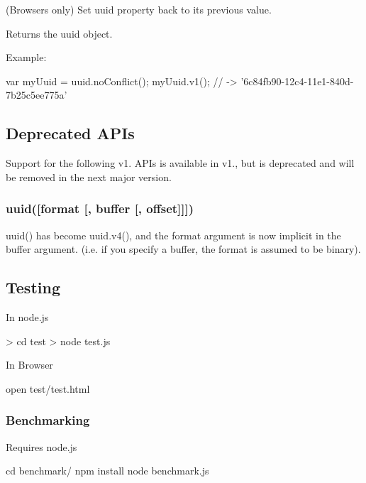 (Browsers only) Set {\ttfamily uuid} property back to it\textquotesingle{}s previous value.

Returns the uuid object.

Example\+:


\begin{DoxyCode}
var myUuid = uuid.noConflict();
myUuid.v1(); // -> '6c84fb90-12c4-11e1-840d-7b25c5ee775a'
\end{DoxyCode}


\subsection*{Deprecated A\+P\+Is}

Support for the following v1. A\+P\+Is is available in v1., but is deprecated and will be removed in the next major version.

\subsubsection*{uuid(\mbox{[}format \mbox{[}, buffer \mbox{[}, offset\mbox{]}\mbox{]}\mbox{]})}

uuid() has become uuid.\+v4(), and the {\ttfamily format} argument is now implicit in the {\ttfamily buffer} argument. (i.\+e. if you specify a buffer, the format is assumed to be binary).

\subsection*{Testing}

In node.\+js


\begin{DoxyCode}
> cd test
> node test.js
\end{DoxyCode}


In Browser


\begin{DoxyCode}
open test/test.html
\end{DoxyCode}


\subsubsection*{Benchmarking}

Requires node.\+js


\begin{DoxyCode}
cd benchmark/
npm install
node benchmark.js
\end{DoxyCode}



